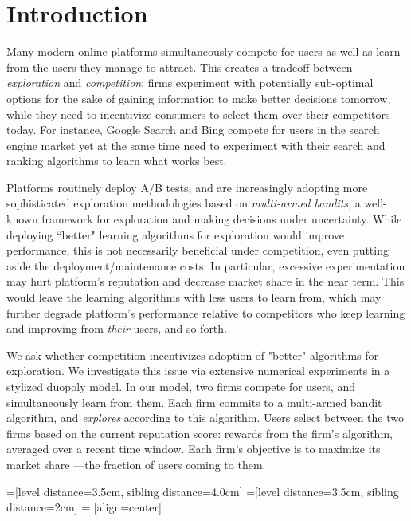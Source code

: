\documentclass[../competing_bandits.tex]{subfiles}
\begin{document}
\section{Introduction}\label{section:1}

Many modern online platforms simultaneously compete for users as well as learn from the users they manage to attract. This creates a tradeoff between \textit{exploration} and \textit{competition}: firms experiment with potentially sub-optimal options for the sake of gaining information to make better decisions tomorrow, while they need to incentivize consumers to select them over their competitors today. For instance, Google Search and Bing compete for users in the search engine market yet at the same time need to experiment with their search and ranking algorithms to learn what works best.

Platforms routinely deploy A/B tests, and are increasingly adopting  more sophisticated exploration methodologies based on \emph{multi-armed bandits}, a well-known framework for exploration and making decisions under uncertainty. While deploying ``better" learning algorithms for exploration would improve performance, this is not necessarily beneficial under competition, even putting aside the deployment/maintenance costs. In particular, excessive experimentation may hurt platform's reputation and decrease market share in the near term. This would leave the learning algorithms with less users to learn from, which may further degrade platform's performance relative to competitors who keep learning and improving from \emph{their} users, and so forth.

We ask whether competition incentivizes adoption of "better" algorithms for exploration. We investigate this issue via extensive numerical experiments in a stylized duopoly model. In our model, two firms compete for users, and simultaneously learn from them. Each firm commits to a multi-armed bandit algorithm, and \emph{explores} according to this algorithm. Users select between the two firms based on the current reputation score: rewards from the firm's algorithm, averaged over a recent time window. Each firm's objective is to maximize its market share ---the fraction of users coming to them.

=[level distance=3.5cm, sibling distance=4.0cm]
=[level distance=3.5cm, sibling distance=2cm]
 = [align=center]
\end{document}
